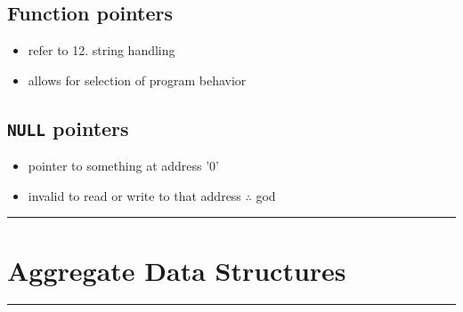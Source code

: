 \documentclass[10pt, multicolumn, a4paper]{article}
\begin{document}
\begin{multicols}{2}
	\subsection*{Function pointers}
	\begin{itemize}
	\item refer to 12. string handling
	\item allows for selection of program behavior
	\end{itemize}
	\subsection*{\texttt{NULL} pointers}
	\begin{itemize}
	\item pointer to something at address '0'
	\item invalid to read or write to that address $\therefore$ god
	\end{itemize}
\end{multicols}

\setcounter{section}{2}
\hrule
\section{Aggregate Data Structures}
\hrule 
\end{document}
